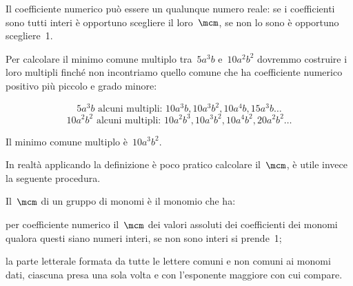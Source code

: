 Il coefficiente numerico può essere un qualunque numero reale: se i
coefficienti sono tutti interi è opportuno scegliere il loro~$\mcm$,
se non lo sono è opportuno scegliere~1.

\begin{exrig}
 \begin{esempio}
Per calcolare il minimo comune multiplo tra~$5a^{3}b$ e~$10a^{2}b^{2}$ dovremmo costruire i loro multipli finché non
incontriamo quello comune che ha coefficiente numerico positivo più
piccolo e grado minore:

\[5a^{3}b\text{ alcuni multipli: }10a^{3}b, 10a^{3}b^{2}, 10a^{4}b, 15a^{3}b\dots\]
\[10a^{2}b^{2}\text{ alcuni multipli: }10a^{2}b^{3}, 10a^{3}b^{2}, 10a^{4}b^{2}, 20a^{2}b^{2}\dots\]

Il minimo comune multiplo è~$10a^{3}b^{2}$.
 \end{esempio}
\end{exrig}

In realtà applicando la definizione è poco pratico calcolare il~$\mcm$, è utile invece la seguente procedura.

\begin{procedura}
Il~$\mcm$ di un gruppo di monomi è il monomio che ha:

\begin{enumeratea}
 \item per coefficiente numerico il~$\mcm$ dei valori assoluti dei
coefficienti dei monomi qualora
questi siano numeri interi, se non sono interi si prende~1;
 \item la parte letterale formata da tutte le lettere comuni e non comuni
ai monomi dati, ciascuna
presa una sola volta e con l'esponente maggiore con
cui compare.
\end{enumeratea}
\end{procedura}

